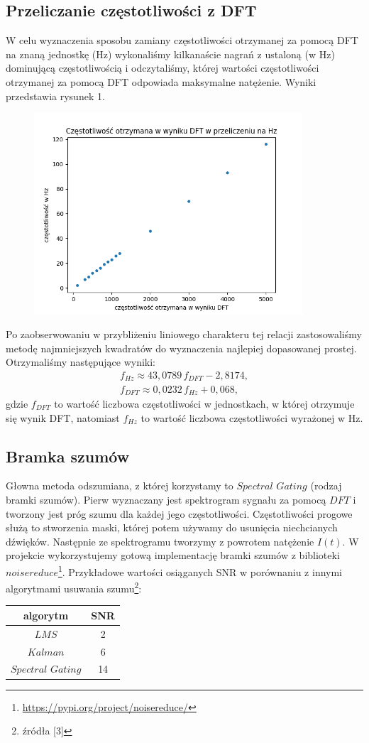 \documentclass[polish]{article}
\begin{document}
\subsection{Przeliczanie częstotliwości z DFT}
W celu wyznaczenia sposobu zamiany częstotliwości otrzymanej za pomocą DFT na znaną jednostkę (Hz) wykonaliśmy kilkanaście nagrań z ustaloną (w Hz) dominującą częstotliwością i odczytaliśmy, której wartości częstotliwości otrzymanej za pomocą DFT odpowiada maksymalne natężenie. Wyniki przedstawia rysunek 1.
\begin{figure}[H]
	\centering
	\includegraphics[width=10cm]{przeliczanie_dft_hz}
	\caption{}
\end{figure}
\noindent Po zaobserwowaniu w przybliżeniu liniowego charakteru tej relacji zastosowaliśmy metodę najmniejszych kwadratów do wyznaczenia najlepiej dopasowanej prostej. Otrzymaliśmy następujące wyniki:
\begin{gather*}
	f_{\unit{Hz}}\approx43,0789\,f_{\unit{DFT}}-2,8174,\\
	f_{\unit{DFT}}\approx0,0232\,f_{\unit{Hz}}+0,068,
\end{gather*}
gdzie $f_{\unit{DFT}}$ to wartość liczbowa częstotliwości w jednostkach, w której otrzymuje się wynik DFT, natomiast $f_{\unit{Hz}}$ to wartość liczbowa częstotliwości wyrażonej w \unit{Hz}.
\subsection{Bramka szumów}
Głowna metoda odszumiana, z której korzystamy to $Spectral$ $Gating$ (rodzaj bramki szumów).  Pierw wyznaczany jest spektrogram sygnału za pomocą $DFT$ i 
tworzony jest próg szumu dla każdej jego częstotliwości.
Częstotliwości progowe służą to stworzenia maski, której potem używamy do usunięcia niechcianych dźwięków.
Następnie ze spektrogramu tworzymy z powrotem natężenie $I(t)$. W projekcie wykorzystujemy gotową implementację bramki szumów z biblioteki $noisereduce$\footnote{\url{https://pypi.org/project/noisereduce/}}. Przykładowe wartości osiąganych SNR w porównaniu z innymi 
algorytmami usuwania szumu\footnote{źródła [3]}:
\begin{center}
\begin{tabular}{c  | c }
algorytm & SNR \\
\hline
$LMS$ & 2 \\
$Kalman$ & 6 \\
$Spectral$ $Gating$ & 14
\end{tabular}
\end{center}
\end{document}
